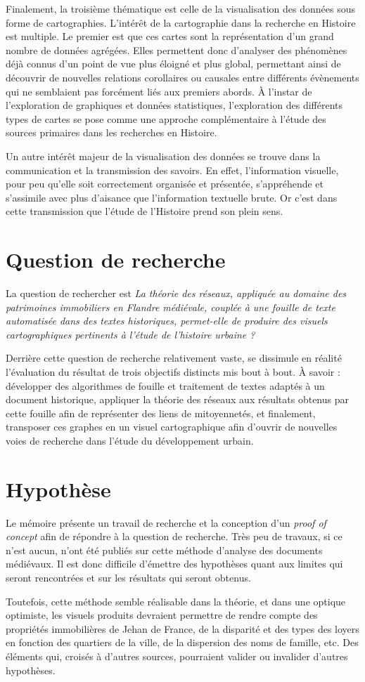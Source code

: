 Finalement, la troisième thématique est celle de la visualisation des données sous forme de cartographies. L’intérêt de la cartographie dans la recherche en Histoire est multiple. Le premier est que ces cartes sont la représentation d’un grand nombre de données agrégées. Elles permettent donc d’analyser des phénomènes déjà connus d’un point de vue plus éloigné et plus global, permettant ainsi de découvrir de nouvelles relations corollaires ou causales entre différents évènements qui ne semblaient pas forcément liés aux premiers abords. À l’instar de l’exploration de graphiques et données statistiques, l’exploration des différents types de cartes se pose comme une approche complémentaire à l’étude des sources primaires dans les recherches en Histoire.

Un autre intérêt majeur de la visualisation des données se trouve dans la communication et la transmission des savoirs. En effet, l’information visuelle, pour peu qu’elle soit correctement organisée et présentée, s’appréhende et s’assimile avec plus d’aisance que l’information textuelle brute. Or c’est dans cette transmission que l’étude de l’Histoire prend son plein sens.

\section{Question de recherche}
 La question de rechercher est \emph{\og La théorie des réseaux, appliquée au domaine des patrimoines immobiliers en Flandre médiévale, couplée à une fouille de texte automatisée dans des textes historiques, permet-elle de produire des visuels cartographiques pertinents à l’étude de l’histoire urbaine ?\fg{}} 
 
 Derrière cette question de recherche relativement vaste, se dissimule en réalité l'évaluation du résultat de trois objectifs distincts mis bout à bout. À savoir : développer des algorithmes de fouille et traitement de textes adaptés à un document historique, appliquer la théorie des réseaux aux résultats obtenus par cette fouille afin de représenter des liens de mitoyennetés, et finalement, transposer ces graphes en un visuel cartographique afin d'ouvrir de nouvelles voies de recherche dans l'étude du développement urbain.
 
\section{Hypothèse}
Le mémoire présente un travail de recherche et la conception d'un \textit{proof of concept} afin de répondre à la question de recherche. Très peu de travaux, si ce n'est aucun, n'ont été publiés sur cette méthode d'analyse des documents médiévaux. Il est donc difficile d'émettre des hypothèses quant aux limites qui seront rencontrées et sur les résultats qui seront obtenus.

Toutefois, cette méthode semble réalisable dans la théorie, et dans une optique optimiste,  les visuels produits devraient permettre de rendre compte des propriétés immobilières de Jehan de France, de la disparité et des types des loyers en fonction des quartiers de la ville, de la dispersion des noms de famille, etc. Des éléments qui, croisés  à d'autres sources, pourraient valider ou invalider d'autres hypothèses. 

